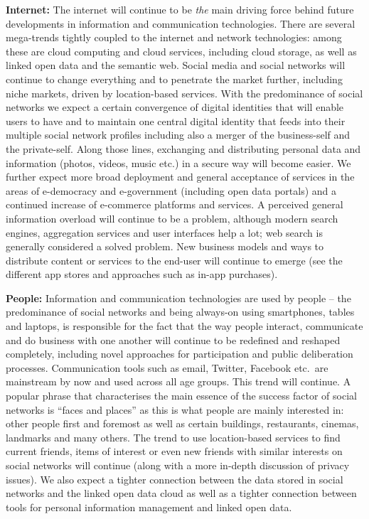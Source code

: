 \documentclass[10pt, plain]{../../metanetpaper}
\begin{document}
\begin{multicols}{2}
\textbf{Internet:} The internet will continue to be \emph{the} main driving force behind future developments in information and communication technologies. There are several mega-trends tightly coupled to the internet and network technologies: among these are cloud computing and cloud services, including cloud storage, as well as linked open data and the semantic web. Social media and social networks will continue to change everything and to penetrate the market further, including niche markets, driven by location-based services. With the predominance of social networks we expect a certain convergence of digital identities that will enable users to have and to maintain one central digital identity that feeds into their multiple social network profiles including also a merger of the business-self and the private-self. Along those lines, exchanging and distributing personal data and information (photos, videos, music etc.) in a secure way will become easier. We further expect more broad deployment and general acceptance of services in the areas of e-democracy and e-government (including open data portals) and a continued increase of e-commerce platforms \cite{bruegel12} and services. A perceived general information overload will continue to be a problem, although modern search engines, aggregation services and user interfaces help a lot; web search is generally considered a solved problem. New business models and ways to distribute content or services to the end-user will continue to emerge (see the different app stores and approaches such as in-app purchases).

\textbf{People:} Information and communication technologies are used by people -- the predominance of social networks and being always-on using smartphones, tables and laptops, is responsible for the fact that the way people interact, communicate and do business with one another will continue to be redefined and reshaped completely, including novel approaches for participation and public deliberation processes. Communication tools such as email, Twitter, Facebook etc.~are mainstream by now and used across all age groups. This trend will continue. A popular phrase that characterises the main essence of the success factor of social networks is ``faces and places'' as this is what people are mainly interested in: other people first and foremost as well as certain buildings, restaurants, cinemas, landmarks and many others. The trend to use location-based services to find current friends, items of interest or even new friends with similar interests on social networks will continue (along with a more in-depth discussion of privacy issues). We also expect a tighter connection between the data stored in social networks and the linked open data cloud as well as a tighter connection between tools for personal information management and linked open data.


\end{multicols}
\end{document}
